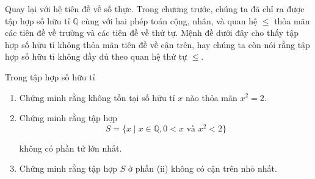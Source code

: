 Quay lại với hệ tiên đề về số thực. Trong chương trước, chúng ta đã chỉ ra được tập hợp số hữu tỉ $\mathbb{Q}$ cùng với hai phép toán cộng, nhân, và quan hệ $\leq$ thỏa mãn các tiên đề về trường và các tiên đề về thứ tự. Mệnh đề dưới đây cho thấy tập hợp số hữu tỉ không thỏa mãn tiên đề về cận trên, hay chúng ta còn nói rằng tập hợp số hữu tỉ không đầy đủ theo quan hệ thứ tự $\leq$.

\begin{proposition}\label{proposition:irrational-cut}
    Trong tập hợp số hữu tỉ
    \begin{enumerate}[label={(\roman*)}]
        \item Chứng minh rằng không tồn tại số hữu tỉ $x$ nào thỏa mãn $x^{2} = 2$.
        \item Chứng minh rằng tập hợp
              \[
                  S = \{ x \mid x\in\mathbb{Q}, 0 < x \text{ và } x^{2} < 2 \}
              \]

              không có phần tử lớn nhất.
        \item Chứng minh rằng tập hợp $S$ ở phần (ii) không có cận trên nhỏ nhất.
    \end{enumerate}
\end{proposition}

